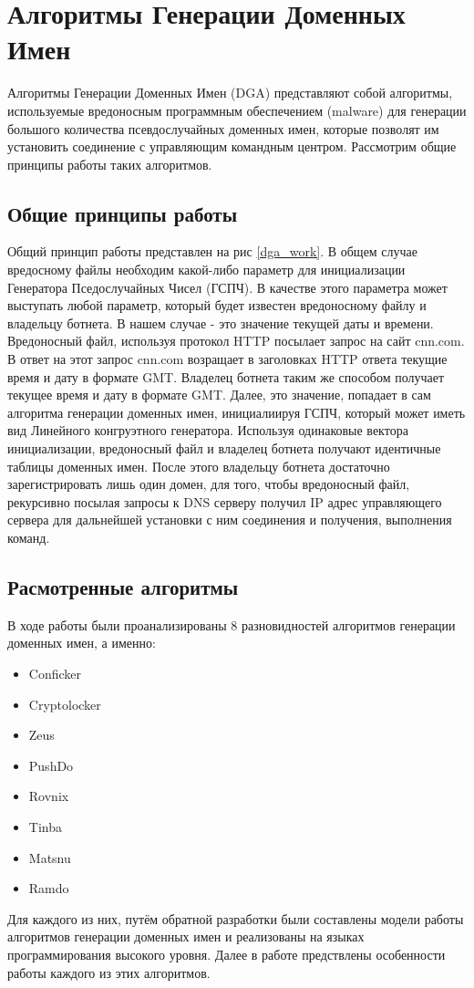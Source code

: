 \section{Алгоритмы Генерации Доменных Имен}
Алгоритмы Генерации Доменных Имен (DGA) представляют собой алгоритмы, используемые вредоносным программным обеспечением (malware) для генерации большого количества псевдослучайных доменных имен, которые позволят им установить соединение с управляющим командным центром. Рассмотрим общие принципы работы таких алгоритмов.
    \subsection{Общие принципы работы}\label{work_princip}
        Общий принцип работы представлен на рис \ref{dga_work}. В общем случае вредосному файлы необходим какой-либо параметр для инициализации Генератора Пседослучайных Чисел (ГСПЧ). В качестве этого параметра может выступать любой параметр, который будет известен вредоносному файлу и владельцу ботнета. В нашем случае - это значение текущей даты и времени. Вредоносный файл, используя протокол HTTP посылает запрос на сайт cnn.com. В ответ на этот запрос cnn.com возращает в заголовках HTTP ответа текущие время и дату в формате GMT. Владелец ботнета таким же способом получает текущее время и дату в формате GMT. Далее, это значение, попадает в сам алгоритма генерации доменных имен, инициалиируя ГСПЧ, который может иметь вид Линейного конгруэтного генератора. Используя одинаковые вектора инициализации, вредоносный файл и владелец ботнета получают идентичные таблицы доменных имен.
        После этого владельцу ботнета достаточно зарегистрировать лишь один домен, для того, чтобы вредоносный файл, рекурсивно посылая запросы к DNS серверу получил IP адрес управляющего сервера для дальнейшей установки с ним соединения и получения, выполнения команд.
    \subsection{Расмотренные алгоритмы}
    В ходе работы были проанализированы 8 разновидностей алгоритмов генерации доменных имен, а именно:
    \begin{itemize}
        \item Conficker
        \item Cryptolocker
        \item Zeus
        \item PushDo
        \item Rovnix
        \item Tinba
        \item Matsnu
        \item Ramdo
    \end{itemize}
    Для каждого из них, путём обратной разработки были составлены модели работы алгоритмов генерации доменных имен и реализованы на языках программирования высокого уровня. Далее в работе предствлены особенности работы каждого из этих алгоритмов.

